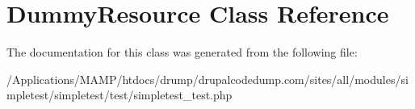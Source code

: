 \hypertarget{class_dummy_resource}{
\section{DummyResource Class Reference}
\label{class_dummy_resource}
}


The documentation for this class was generated from the following file:\begin{DoxyCompactItemize}
\item 
/Applications/MAMP/htdocs/drump/drupalcodedump.com/sites/all/modules/simpletest/simpletest/test/simpletest\_\-test.php\end{DoxyCompactItemize}
